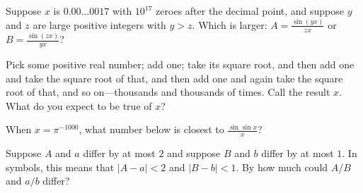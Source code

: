 \documentclass{ximera}
\begin{document}
\begin{problem}
  Suppose $x$ is $0.00\dots 0017$ with $10^{17}$ zeroes after the
  decimal point, and suppose $y$ and $z$ are large positive integers
  with $y > z$.  Which is larger: $A = \frac{\sin (yx)}{zx}$ or
  $B = \frac{\sin (zx)}{yx}$?
  \begin{multipleChoice}
  \end{multipleChoice}
\end{problem}

\begin{problem}
  Pick some positive real number; add one; take its square root, and
  then add one and take the square root of that, and then add one and
  again take the square root of that, and so on---thousands and
  thousands of times.  Call the result $x$.  What do you expect to be
  true of $x$?
  \begin{multipleChoice}
  \end{multipleChoice}
\end{problem}

\begin{problem}
  When $x = \pi^{-1000}$, what number below is closest to $\frac{\sin \sin x}{x}$?
  \begin{multipleChoice}
  \end{multipleChoice}
\end{problem}

\begin{problem}
  Suppose $A$ and $a$ differ by at most $2$ and suppose $B$ and $b$
  differ by at most $1$.  In symbols, this means that $|A - a| < 2$ and $|B - b| < 1$.
  By how much could $A/B$ and $a/b$ differ?
  \begin{multipleChoice}
  \end{multipleChoice}
\end{problem}
\end{document}
